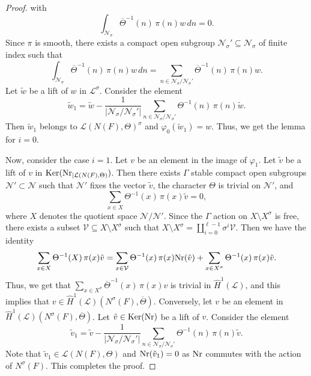 \documentclass[10pt, reqno]{amsart}
\theoremstyle{plain}
\numberwithin{equation}{section} \newcommand{\di}{\operatorname{dim}}
\begin{document}
\begin{proof}
with
$$ \int_{\mathcal{N}_{\sigma}}\overline{\Theta}^{-1}(n)\,
\pi(n)w\,dn = 0. $$ Since $\pi$ is smooth, there exists a compact open
subgroup $\mathcal{N}_{\sigma}'\subseteq \mathcal{N}_{\sigma}$ of
finite index such that
$$ \int_{\mathcal{N}_{\sigma}}
\overline{\Theta}^{-1}(n)\,\pi(n)w\,dn = \sum_{n\in
  \mathcal{N}_{\sigma}/\mathcal{N}_{\sigma}'}
\overline{\Theta}^{-1}(n)\,\pi(n)w. $$ Let $\tilde{w}$ be a lift of
$w$ in $\mathcal{L}^\sigma$. Consider the element
$$ \tilde{w}_1 = \tilde{w} -
\frac{1}{\lvert\mathcal{N}_{\sigma}
/\mathcal{N}_{\sigma}'\rvert} \sum_{n\in \mathcal{N}_{\sigma}/\mathcal{N}_{\sigma}'}
\Theta^{-1}(n)\,\pi(n)\tilde{w}. $$
Then $\tilde{w}_1$ belongs to $\mathcal{L}(N(F),\Theta)^\sigma$ 
and $\varphi_0(\tilde{w}_1) = w$. 
Thus, we get the lemma for
$i=0$.

Now, consider the case $i=1$. Let $v$ be an element in the image of
$\varphi_1$.  Let $\tilde{v}$ be a lift of $v$ in
${\rm Ker}({\rm Nr}_{|\mathcal{L}(N(F),\Theta)})$. Then there exists
$\Gamma$ stable compact open subgroups
$\mathcal{N}'\subset \mathcal{N}$ such that $\mathcal{N}'$ fixes the
vector $\tilde{v}$, the character $\Theta$ is trivial on $\mathcal{N}'$, and
$$ \sum_{x\in X}\Theta^{-1}(x)\,\pi(x)\tilde{v} = 0, $$ 
where $X$ denotes the quotient space $\mathcal{N}/\mathcal{N}'$. Since
the $\Gamma$ action on $X\setminus X^\sigma$ is free,
there exists a subset $\mathcal{V}\subseteq X\setminus X^\sigma$ such
that $X\setminus X^\sigma
= \coprod_{i=0}^{\ell-1}\sigma^i\mathcal{V}$.
Then we have the identity
$$ \sum_{x\in X}\Theta^{-1}(X)\,\pi(x)\tilde{v}
= \sum_{x\in\mathcal{V}}\Theta^{-1}(x)\,\pi(x){\rm Nr}(\tilde{v})+
\sum_{x\in X^\sigma}\Theta^{-1}(x)\,\pi(x)\tilde{v}. $$ Thus, we get
that $\sum_{x\in X^\sigma}\overline{\Theta}^{-1}(x)\,\pi(x)v$ is
trivial in $\widehat{H}^1(\mathcal{L})$, and this implies that
$v\in \widehat{H}^1(\mathcal{L})
(N^\sigma(F),\overline{\Theta})$. Conversely, let $v$ be an element in
$\widehat{H}^1(\mathcal{L}) (N^\sigma(F),\overline{\Theta})$. Let
$\tilde{v}\in {\rm Ker}({\rm Nr})$ be a lift of $v$. Consider the
element
$$ \tilde{v}_1=\tilde{v}-\dfrac{1}
{|\mathcal{N}_\sigma/\mathcal{N}_\sigma'|} \sum_{n\in
  \mathcal{N}_\sigma/\mathcal{N}_\sigma'}
\Theta^{-1}(n)\,\pi(n)\tilde{v}. $$ Note that
$\tilde{v}_1\in \mathcal{L}(N(F),\Theta)$ and
${\rm Nr}(\tilde{v}_1)=0$ as ${\rm Nr}$ commutes with the action of
$N^\sigma(F)$.  This completes the proof.
\end{proof}
\end{document}
